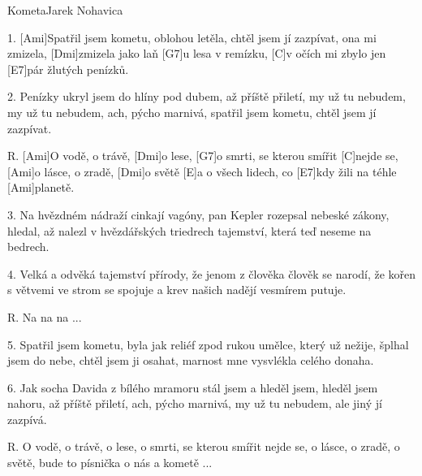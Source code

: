 \begin{song}{Kometa}{Jarek Nohavica}

\begin{xverse}{1. }
[Ami]Spatřil jsem kometu, oblohou letěla,
chtěl jsem jí zazpívat, ona mi zmizela,
[Dmi]zmizela jako laň [G7]u lesa v remízku,
[C]v očích mi zbylo jen [E7]pár žlutých penízků.
\end{xverse}

\begin{xverse}{2. }
Penízky ukryl jsem do hlíny pod dubem,
až příště přiletí, my už tu nebudem,
my už tu nebudem, ach, pýcho marnivá,
spatřil jsem kometu, chtěl jsem jí zazpívat.
\end{xverse}

\begin{xverse}{R. }
[Ami]O vodě, o trávě, [Dmi]o lese,
[G7]o smrti, se kterou smířit [C]nejde se,
[Ami]o lásce, o zradě, [Dmi]o světě
[E]a o všech lidech, co [E7]kdy žili na téhle [Ami]planetě.
\end{xverse}

\begin{xverse}{3. }
Na hvězdném nádraží cinkají vagóny,
pan Kepler rozepsal nebeské zákony,
hledal, až nalezl v hvězdářských triedrech
tajemství, která teď neseme na bedrech.
\end{xverse}

\begin{xverse}{4. }
Velká a odvěká tajemství přírody,
že jenom z člověka člověk se narodí,
že kořen s větvemi ve strom se spojuje
a krev našich nadějí vesmírem putuje.
\end{xverse}

\begin{xverse}{R. }
Na na na ...
\end{xverse}


\begin{xverse}{5. }
Spatřil jsem kometu, byla jak reliéf
zpod rukou umělce, který už nežije,
šplhal jsem do nebe, chtěl jsem ji osahat,
marnost mne vysvlékla celého donaha.
\end{xverse}


\begin{xverse}{6. }
Jak socha Davida z bílého mramoru
stál jsem a hleděl jsem, hleděl jsem nahoru,
až příště přiletí, ach, pýcho marnivá,
my už tu nebudem, ale jiný jí zazpívá.
\end{xverse}

\begin{xverse}{R. }
O vodě, o trávě, o lese,
o smrti, se kterou smířit nejde se,
o lásce, o zradě, o světě,
bude to písnička o nás a kometě ...
\end{xverse}

\end{song}

